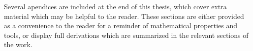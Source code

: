         Several apendices are included at the end of this thesis, which cover extra material which may be helpful to the reader. These sections are either provided as a convenience to the reader for a reminder of mathematical properties and tools, or display full derivations which are summarized in the relevant sections of the work.
